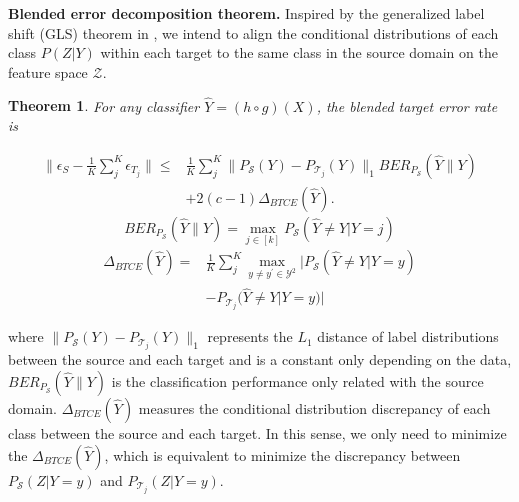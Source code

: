 \documentclass[letterpaper]{article} \usepackage{aaai23}  \usepackage{times}  \usepackage{helvet}  \usepackage{courier}  \usepackage[hyphens]{url}  \usepackage{graphicx} \urlstyle{rm} \def\UrlFont{\rm}  \usepackage{natbib}  \usepackage{caption} \frenchspacing  \setlength{\pdfpagewidth}{8.5in}  \setlength{\pdfpageheight}{11in}
\newtheorem{theorem}{Theorem}
\begin{document}
\noindent\textbf{Blended error decomposition theorem.} Inspired by the generalized label shift (GLS) theorem in 
\cite{tachet2020domain}, we intend to align the conditional distributions of each class $P(Z|Y)$ within each target to the same class in the source domain on the feature space $\mathcal{Z}$. 
\begin{theorem}
For any classifier $\hat{Y}=(h\circ g)(X)$, the blended target error rate is
\begin{small}
\begin{equation}
\begin{split}
\| \epsilon_S  - \frac{1}{K} \sum_{j}^K \epsilon_{T_j} \| \leq & \frac{1}{K} \sum_{j}^K \| P_{\mathcal{S}}(Y) - P_{\mathcal{T}_j}(Y) \|_1 BER_{P_{\mathcal{S}}}(\hat{Y}\|Y) \\
& + 2(c-1)\Delta_{BTCE}(\hat{Y}).
\end{split}
\end{equation}
\label{BER}
\begin{equation}
BER_{P_{\mathcal{S}}}(\hat{Y}\|Y) = \max_{j \in [k]} P_{\mathcal{S}}(\hat{Y} \neq Y | Y = j)
\end{equation}
\begin{equation}
\begin{split}
\Delta_{BTCE}(\hat{Y}) = & \frac{1}{K} \sum_{j}^K \max_{y \neq y^\prime \in \mathcal{Y}^2}| P_{\mathcal{S}}(\hat{Y} \neq Y | Y=y)  \\
& - P_{\mathcal{T}_j}(\hat{Y} \neq Y | Y=y)|
\end{split}
\end{equation}
\end{small}
\end{theorem}
where $\| P_{\mathcal{S}}(Y) - P_{\mathcal{T}_j}(Y) \|_1$ represents the $L_1$ distance of label distributions between the source and each target and is a constant only depending on the data, $BER_{P_{\mathcal{S}}}(\hat{Y}\|Y)$ is the classification performance only related with the source domain. $\Delta_{BTCE}(\hat{Y})$ measures the conditional distribution discrepancy of each class between the source and each target. In this sense, we only need to minimize the $\Delta_{BTCE}(\hat{Y})$, which is equivalent to minimize the discrepancy between $P_{\mathcal{S}}(Z | Y=y)$ and $P_{\mathcal{T}_j}(Z | Y=y)$.
\end{document}
